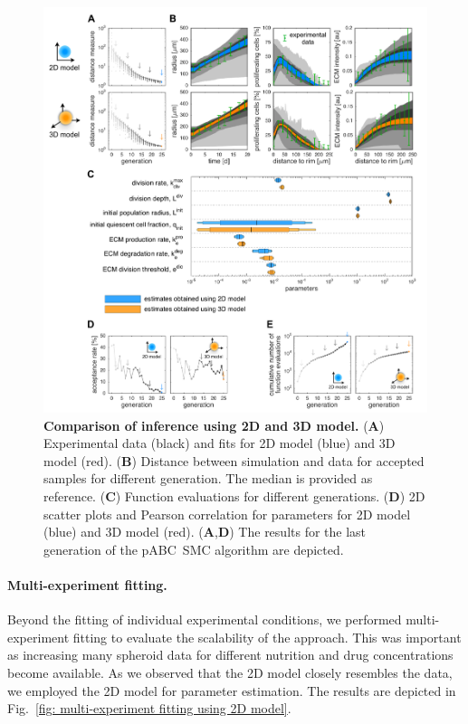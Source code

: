 \documentclass[10pt,letterpaper]{article}
\begin{document}
\begin{figure}[p]
\begin{adjustwidth}{-2in}{0in}
\begin{center}
\includegraphics[width=1.3\textwidth]{fig__2D_3D_comparison}
\end{center}
\caption{{\bf Comparison of inference using 2D and 3D model.}
(\textbf{A}) Experimental data (black) and fits for 2D model (blue) and 3D model (red).
(\textbf{B}) Distance between simulation and data for accepted samples for different generation. The median is provided as reference. 
(\textbf{C}) Function evaluations for different generations.
(\textbf{D}) 2D scatter plots and Pearson correlation for parameters for 2D model (blue) and 3D model (red). 
(\textbf{A},\textbf{D}) The results for the last generation of the pABC~SMC algorithm are depicted.
}
\label{fig: fitting of 2D and 3D model to experimental data for case without nutrition limitation}
\end{adjustwidth}
\end{figure}




\paragraph*{Multi-experiment fitting.}
Beyond the fitting of individual experimental conditions, we performed multi-experiment fitting to evaluate the scalability of the approach. This was important as increasing many spheroid data for different nutrition and drug concentrations become available\cite{KwapiszewskaMic2014}. As we observed that the 2D model closely resembles the data, we employed the 2D model for parameter estimation. The results are depicted in Fig.~\ref{fig: multi-experiment fitting using 2D model}.
\end{document}
